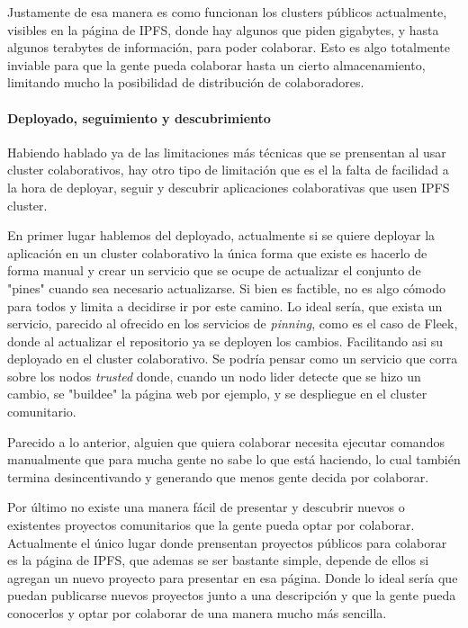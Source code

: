 Justamente de esa manera es como funcionan los clusters públicos actualmente, visibles en la página de IPFS\cite{collaborative-clusters}, donde hay algunos que piden gigabytes, y hasta algunos terabytes de información, para poder colaborar. Esto es algo totalmente inviable para que la gente pueda colaborar hasta un cierto almacenamiento, limitando mucho la posibilidad de distribución de colaboradores.

\paragraph{Deployado, seguimiento y descubrimiento}

Habiendo hablado ya de las limitaciones más técnicas que se prensentan al usar cluster colaborativos, hay otro tipo de limitación que es el la falta de facilidad a la hora de deployar, seguir y descubrir aplicaciones colaborativas que usen IPFS cluster.

En primer lugar hablemos del deployado, actualmente si se quiere deployar la aplicación en un cluster colaborativo la única forma que existe es hacerlo de forma manual y crear un servicio que se ocupe de actualizar el conjunto de "pines" cuando sea necesario actualizarse. Si bien es factible, no es algo cómodo para todos y limita a decidirse ir por este camino. Lo ideal sería, que exista un servicio, parecido al ofrecido en los servicios de \textit{pinning}, como es el caso de Fleek\cite{fleek}, donde al actualizar el repositorio ya se deployen los cambios. Facilitando asi su deployado en el cluster colaborativo. Se podría pensar como un servicio que corra sobre los nodos \textit{trusted} donde, cuando un nodo lider detecte que se hizo un cambio, se "buildee" la página web por ejemplo, y se despliegue en el cluster comunitario.

Parecido a lo anterior, alguien que quiera colaborar necesita ejecutar comandos manualmente que para mucha gente no sabe lo que está haciendo, lo cual también termina desincentivando y generando que menos gente decida por colaborar.

Por último no existe una manera fácil de presentar y descubrir nuevos o existentes proyectos comunitarios que la gente pueda optar por colaborar. Actualmente el único lugar donde prensentan proyectos públicos para colaborar es la página de IPFS\cite{collaborative-clusters}, que ademas se ser bastante simple, depende de ellos si agregan un nuevo proyecto para presentar en esa página. Donde lo ideal sería que puedan publicarse nuevos proyectos junto a una descripción y que la gente pueda conocerlos y optar por colaborar de una manera mucho más sencilla.

